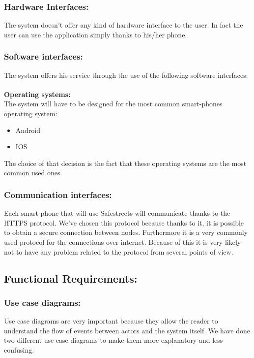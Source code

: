 \documentclass[titlepage]{article}
\begin{document}
\subsubsection{Hardware Interfaces: }
The system doesn't offer any kind of hardware interface to the user. In fact the user can use the application simply thanks to his/her phone.
\subsubsection{Software interfaces: }
The system offers his service through the use of the following software interfaces:\\ \\
\textbf{Operating systems:\\ }
The system will have to be designed for the most common smart-phones operating system: 
	
\begin{itemize}
	\item Android 
	\item IOS
\end{itemize}	
The choice of that decision is the fact that these operating systems are the most common used ones.
	
\subsubsection{Communication interfaces: }
Each smart-phone that will use Safestreets will communicate thanks to the HTTPS protocol. We've chosen this protocol because thanks to it, it is possible to obtain a secure connection between nodes. Furthermore it is a very commonly used protocol for the connections over internet. Because of this it is very likely not to have any problem related to the protocol from several points of view.
\subsection{Functional Requirements:}
\subsubsection{Use case diagrams: }
Use case diagrams are very important because they allow the reader to understand the flow of events between actors and the system itself. We have done two different use case diagrams to make them more explanatory and less confusing.
\end{document}
